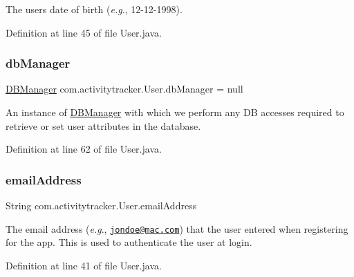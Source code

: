 The user\textquotesingle{}s date of birth ({\itshape e.\+g}., 12-\/12-\/1998). 

Definition at line 45 of file User.\+java.

\mbox{\label{classcom_1_1activitytracker_1_1_user_a8c8b36433447a235f2b4940b92e839c1}} 
\subsubsection{\texorpdfstring{db\+Manager}{dbManager}}
{\footnotesize\ttfamily \mbox{\hyperlink{classcom_1_1activitytracker_1_1_d_b_manager}{D\+B\+Manager}} com.\+activitytracker.\+User.\+db\+Manager = null\hspace{0.3cm}{\ttfamily [private]}}

An instance of \mbox{\hyperlink{classcom_1_1activitytracker_1_1_d_b_manager}{D\+B\+Manager}} with which we perform any DB accesses required to retrieve or set user attributes in the database. 

Definition at line 62 of file User.\+java.

\mbox{\label{classcom_1_1activitytracker_1_1_user_ac2fdb9a858d0295e52c5f8bc179e3137}} 
\subsubsection{\texorpdfstring{email\+Address}{emailAddress}}
{\footnotesize\ttfamily String com.\+activitytracker.\+User.\+email\+Address\hspace{0.3cm}{\ttfamily [private]}}

The email address ({\itshape e.\+g}., \href{mailto:jondoe@mac.com}{\tt jondoe@mac.\+com}) that the user entered when registering for the app. This is used to authenticate the user at login. 

Definition at line 41 of file User.\+java.

\mbox{\label{classcom_1_1activitytracker_1_1_user_a83cdfe6f520a4e18e8710e8e11f8c3d6}} 
